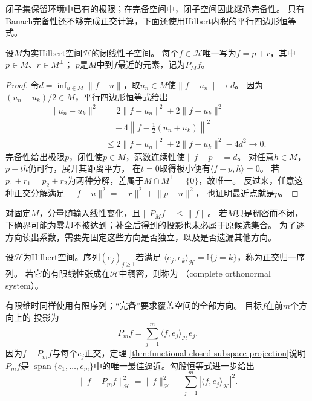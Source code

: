 闭子集保留环境中已有的极限；在完备空间中，闭子空间因此继承完备性。
只有Banach完备性还不够完成正交计算，下面还使用Hilbert内积的平行四边形恒等式。
\begin{theorem}[闭线性子空间的正交投影]
\label{thm:functional-closed-subspace-projection}
设$M$为实Hilbert空间$\mathcal H$的闭线性子空间。
每个$f\in\mathcal H$唯一写为$f=p+r$，其中$p\in M$、$r\in M^\perp$；
$p$是$M$中到$f$最近的元素，记为$P_Mf$。
\end{theorem}
\begin{proof}
令$d=\inf_{u\in M}\lVert f-u\rVert$，取$u_n\in M$使$\lVert f-u_n\rVert\to d$。
因为$(u_n+u_k)/2\in M$，平行四边形恒等式给出
\[
\begin{aligned}
 \lVert u_n-u_k\rVert^2
 &=2\lVert f-u_n\rVert^2+2\lVert f-u_k\rVert^2\\
 &\quad-4\left\lVert f-\tfrac12(u_n+u_k)\right\rVert^2\\
 &\leq2\lVert f-u_n\rVert^2+2\lVert f-u_k\rVert^2-4d^2\to0.
\end{aligned}
\]
完备性给出极限$p$，闭性使$p\in M$，范数连续性使$\lVert f-p\rVert=d$。
对任意$h\in M$，$p+th$仍可行，展开其距离平方，
在$t=0$取得极小便有$\langle f-p,h\rangle=0$。
若$p_1+r_1=p_2+r_2$为两种分解，差属于$M\cap M^\perp=\{0\}$，故唯一。
反过来，任意这种正交分解满足
$\lVert f-u\rVert^2=\lVert r\rVert^2+\lVert p-u\rVert^2$，
也证明最近点就是$p$。
\end{proof}
对固定$M$，分量随输入线性变化，且$\lVert P_Mf\rVert\leq\lVert f\rVert$。
若$M$只是稠密而不闭，下确界可能为零却不被达到；补全后得到的投影也未必属于原候选集合。
为了逐方向读出系数，需要先固定这些方向是否独立，以及是否遗漏其他方向。
\begin{definition}[正交归一序列与完备正交系]
\label{def:functional-complete-orthonormal-system}
设$\mathcal H$为Hilbert空间。序列$(e_j)_{j\geq1}$若满足
$\langle e_j,e_k\rangle_{\mathcal H}=\mathbb I\{j=k\}$，称为正交归一序列。
若它的有限线性张成在$\mathcal H$中稠密，则称为
（complete orthonormal system）。
\end{definition}
有限维时同样使用有限序列；“完备”要求覆盖空间的全部方向。
目标$f$在前$m$个方向上的
投影为
\begin{equation}
  P_m f
  =
  \sum_{j=1}^{m}
  \langle f,e_j\rangle_{\mathcal{H}}e_j.
  \label{eq:functional-orthogonal-partial-projection}
\end{equation}
因为$f-P_mf$与每个$e_j$正交，定理
\ref{thm:functional-closed-subspace-projection}说明$P_mf$是
$\operatorname{span}\{e_1,\ldots,e_m\}$中的唯一最佳逼近。勾股恒等式进一步给出
\begin{equation}
  \lVert f-P_mf\rVert_{\mathcal{H}}^2
  =
  \lVert f\rVert_{\mathcal{H}}^2
  -
  \sum_{j=1}^{m}
  |\langle f,e_j\rangle_{\mathcal{H}}|^2.
  \label{eq:functional-projection-error-decomposition}
\end{equation}
